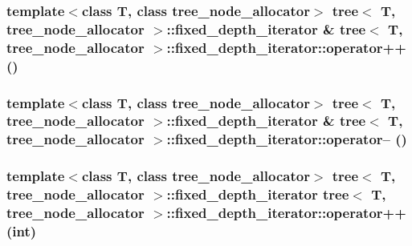 \hypertarget{classtree_1_1fixed__depth__iterator_71bcee62caa033974d5c0d94ab0dc0c6}{
\subsubsection{\setlength{\rightskip}{0pt plus 5cm}template$<$class T, class tree\_\-node\_\-allocator$>$ {\bf tree}$<$ T, tree\_\-node\_\-allocator $>$::{\bf fixed\_\-depth\_\-iterator} \& {\bf tree}$<$ T, tree\_\-node\_\-allocator $>$::fixed\_\-depth\_\-iterator::operator++ ()}}
\label{classtree_1_1fixed__depth__iterator_71bcee62caa033974d5c0d94ab0dc0c6}


\hypertarget{classtree_1_1fixed__depth__iterator_39a2c5b5048ec0dfff33fbb55bd7767e}{
\subsubsection{\setlength{\rightskip}{0pt plus 5cm}template$<$class T, class tree\_\-node\_\-allocator$>$ {\bf tree}$<$ T, tree\_\-node\_\-allocator $>$::{\bf fixed\_\-depth\_\-iterator} \& {\bf tree}$<$ T, tree\_\-node\_\-allocator $>$::fixed\_\-depth\_\-iterator::operator-- ()}}
\label{classtree_1_1fixed__depth__iterator_39a2c5b5048ec0dfff33fbb55bd7767e}


\hypertarget{classtree_1_1fixed__depth__iterator_f1a1bf2404498a385611f938c2d6a750}{
\subsubsection{\setlength{\rightskip}{0pt plus 5cm}template$<$class T, class tree\_\-node\_\-allocator$>$ {\bf tree}$<$ T, tree\_\-node\_\-allocator $>$::{\bf fixed\_\-depth\_\-iterator} {\bf tree}$<$ T, tree\_\-node\_\-allocator $>$::fixed\_\-depth\_\-iterator::operator++ (int)}}
\label{classtree_1_1fixed__depth__iterator_f1a1bf2404498a385611f938c2d6a750}


